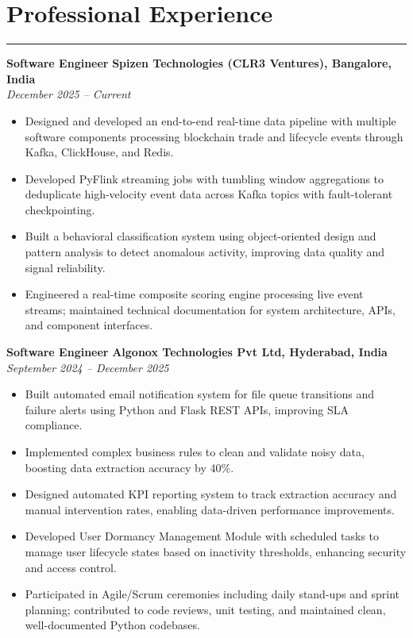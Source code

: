 \documentclass[12pt]{article}
\begin{document}
\section*{Professional Experience}
\vspace{1pt}\hrule\vspace{4pt}

\textbf{Software Engineer} \hfill \textbf{Spizen Technologies (CLR3 Ventures), Bangalore, India} \\
\textit{December 2025 -- Current}
\begin{itemize}
  \item Designed and developed an end-to-end real-time data pipeline with multiple software components processing blockchain trade and lifecycle events through Kafka, ClickHouse, and Redis.
  \item Developed PyFlink streaming jobs with tumbling window aggregations to deduplicate high-velocity event data across Kafka topics with fault-tolerant checkpointing.
  \item Built a behavioral classification system using object-oriented design and pattern analysis to detect anomalous activity, improving data quality and signal reliability.
  \item Engineered a real-time composite scoring engine processing live event streams; maintained technical documentation for system architecture, APIs, and component interfaces.
\end{itemize}

\textbf{Software Engineer} \hfill \textbf{Algonox Technologies Pvt Ltd, Hyderabad, India} \\
\textit{September 2024 -- December 2025}
\begin{itemize}
  \item Built automated email notification system for file queue transitions and failure alerts using Python and Flask REST APIs, improving SLA compliance.
  \item Implemented complex business rules to clean and validate noisy data, boosting data extraction accuracy by 40\%.
  \item Designed automated KPI reporting system to track extraction accuracy and manual intervention rates, enabling data-driven performance improvements.
  \item Developed User Dormancy Management Module with scheduled tasks to manage user lifecycle states based on inactivity thresholds, enhancing security and access control.
  \item Participated in Agile/Scrum ceremonies including daily stand-ups and sprint planning; contributed to code reviews, unit testing, and maintained clean, well-documented Python codebases.
\end{itemize}
\end{document}
